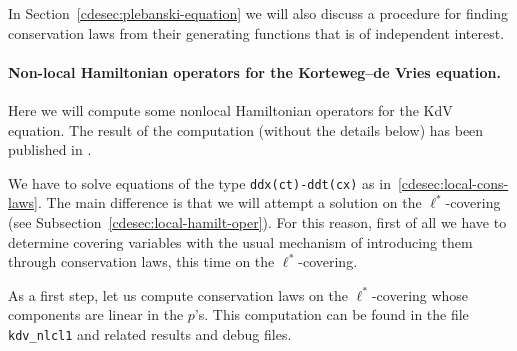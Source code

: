 In Section~\ref{cdesec:plebanski-equation} we will also discuss a procedure for
finding conservation laws from their generating functions that is of
independent interest.

\paragraph*{Non-local Hamiltonian operators for the
  Korteweg--de Vries equation.}
\label{cdesec:korteweg-de-vries-1}
Here we will compute some nonlocal Hamiltonian operators for the KdV
equation. The result of the computation (without the details below) has been
published in \cite{KerstenKrasilshchikVerboretsky:2004}.

We have to solve equations of the type \texttt{ddx(ct)-ddt(cx)} as
in~\ref{cdesec:local-cons-laws}. The main difference is that we will attempt a
solution on the $\ell^*$-covering (see Subsection~\ref{cdesec:local-hamilt-oper}).
For this reason, first of all we have to determine covering variables with the
usual mechanism of introducing them through conservation laws, this time on the
$\ell^*$-covering.

As a first step, let us compute conservation laws on the $\ell^*$-covering
whose components are linear in the $p$'s.  This computation can be found in the
file \texttt{kdv\_nlcl1} and related results and debug files.

